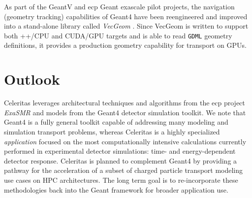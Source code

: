 \documentclass[10pt]{article}
\begin{document}
As part of the GeantV and \ac{ecp} Geant exascale pilot projects, the navigation
(geometry tracking) capabilities of Geant4 have been reengineered and improved
into a stand-alone library called \emph{VecGeom}
\cite{apostolakis_towards_2015}. Since VecGeom is written to support both
\C++/CPU and CUDA/GPU targets and is able to read \texttt{GDML} geometry
definitions, it provides a production geometry capability for transport on GPUs.

\section*{Outlook}

Celeritas leverages architectural techniques and algorithms from the \ac{ecp}
project \emph{ExaSMR} and models from the Geant4 detector simulation toolkit. We
note that Geant4 is a fully general toolkit capable of addressing many
modeling  and simulation transport problems, whereas Celeritas is a highly
specialized \emph{application} focused on the most computationally intensive
calculations currently performed in experimental detector simulations: time- and
energy-dependent detector response.  Celeritas is planned to complement Geant4
by providing a pathway for the acceleration of a subset of charged particle
transport modeling use cases on HPC architectures. The long term goal is to
re-incorporate these methodologies back into the Geant framework for broader
application use.

\pagebreak
\printbibliography

\end{document}
